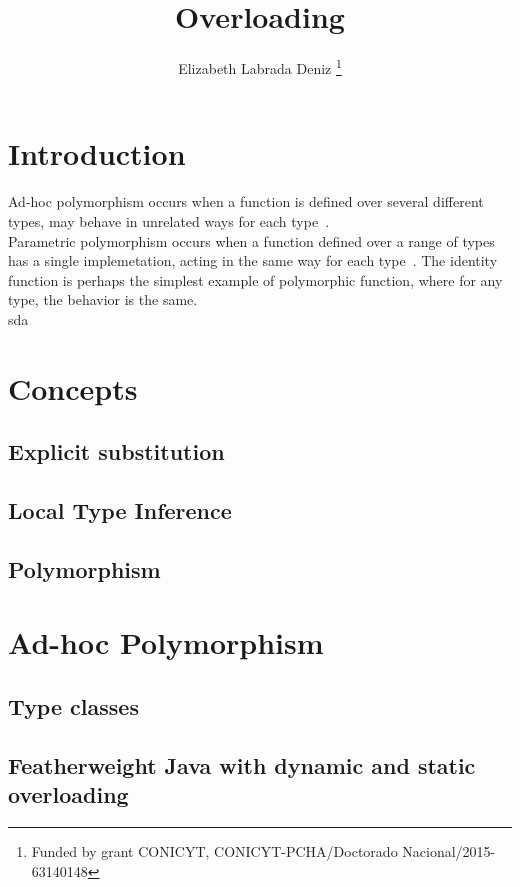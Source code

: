 \documentclass{article}
\title{\bf Overloading}
\author{Elizabeth Labrada Deniz
\thanks{Funded by grant CONICYT, CONICYT-PCHA/Doctorado Nacional/2015-63140148}}
\affil{Computer Science Department (DCC), University of Chile, Chile}
\date{}
\begin{document}
	\maketitle
	\renewcommand{\abstractname}{Abstract}	
	\begin{abstract}
	\end{abstract}	
\section{Introduction}
Ad-hoc polymorphism occurs when a function is defined over several different types, may behave in unrelated ways for each type~\cite{wadlerBlott:popl89}.\\
Parametric polymorphism occurs when a function defined over a range of types has a single implemetation, acting in the same way for each type~\cite{scott}. The identity function is perhaps the simplest example of polymorphic function, where for any type, the behavior is the same.\\
sda~\cite{CardelliWegner}
\section{Concepts}\label{section:concepts}
\subsection{Explicit substitution}
\subsection{Local Type Inference}
\subsection{Polymorphism}
\section{Ad-hoc Polymorphism}\label{section:polymorphism}
\subsection{Type classes}
\subsection{Featherweight Java with dynamic and static overloading}

\medskip 


\end{document}
